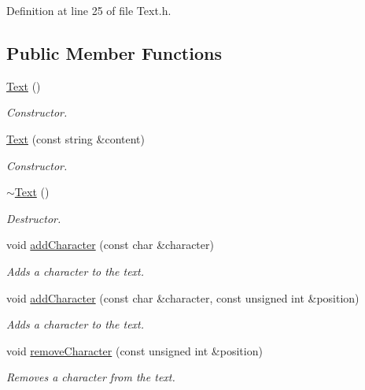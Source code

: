 Definition at line 25 of file Text.h.\subsection*{Public Member Functions}
\begin{CompactItemize}
\item 
\hyperlink{class_text_b3e26143fccc52699bcc5149cae852bc}{Text} ()
\begin{CompactList}\small\item\em Constructor. \item\end{CompactList}\item 
\hyperlink{class_text_e768cfd2aa0b9baaf25dffcb717ae314}{Text} (const string \&content)
\begin{CompactList}\small\item\em Constructor. \item\end{CompactList}\item 
\hyperlink{class_text_2d49e5c280e205125b149f7777ae30c7}{$\sim$Text} ()
\begin{CompactList}\small\item\em Destructor. \item\end{CompactList}\item 
void \hyperlink{class_text_6e6da63c90af68639adc7dd1336f6bf9}{addCharacter} (const char \&character)
\begin{CompactList}\small\item\em Adds a character to the text. \item\end{CompactList}\item 
void \hyperlink{class_text_fdd11ad0c90ca483d4cff3d74a64da9e}{addCharacter} (const char \&character, const unsigned int \&position)
\begin{CompactList}\small\item\em Adds a character to the text. \item\end{CompactList}\item 
void \hyperlink{class_text_e04500eeada2a4a3bb00554b32263c52}{removeCharacter} (const unsigned int \&position)
\begin{CompactList}\small\item\em Removes a character from the text. \item\end{CompactList}\item 

\end{CompactItemize}

